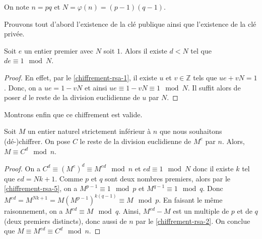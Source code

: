   \begin{notation}
    On note $n = pq$ et $N = \varphi(n) = (p-1)(q-1)$.
  \end{notation}

  Prouvons tout d'abord l'existence de la clé publique ainsi que l'existence de la clé privée.

  \begin{proposition}
    Soit $e$ un entier premier avec $N$ soit $1$. Alors il existe $d < N$ tel que $de \equiv 1 \mod N$.
  \end{proposition}

  \begin{proof}
    En effet, par le \cref{chiffrement-rsa-1}, il existe $u$ et $v \in \mathbb{Z}$ tels que $ue + vN = 1$. Donc, on a $ue = 1 - vN$ et ainsi $ue \equiv 1 - vN \equiv 1 \mod N$. Il suffit alors de poser $d$ le reste de la division euclidienne de $u$ par $N$.
  \end{proof}

  Montrons enfin que ce chiffrement est valide.

  \begin{proposition}
    Soit $M$ un entier naturel strictement inférieur à $n$ que nous souhaitons (dé-)chiffrer. On pose $C$ le reste de la division euclidienne de $M^e$ par $n$. Alors, $M \equiv C^d \mod n$.
  \end{proposition}

  \begin{proof}
    On a $C^d \equiv (M^e)^d \equiv M^{ed} \mod n$ et $ed \equiv 1 \mod N$ donc il existe $k$ tel que $ed = Nk + 1$. Comme $p$ et $q$ sont deux nombres premiers, alors par le \cref{chiffrement-rsa-5}, on a $M^{p-1} \equiv 1 \mod p$ et $M^{q-1} \equiv 1 \mod q$. Donc $M^{ed} = M^{Nk + 1} = M(M^{p-1})^{k(q-1)} \equiv M \mod p$. En faisant le même raisonnement, on a $M^{ed} \equiv M \mod q$. Ainsi, $M^{ed}-M$ est un multiple de $p$ et de $q$ (deux premiers distincts), donc aussi de $n$ par le \cref{chiffrement-rsa-2}. On conclue que $M \equiv M^{ed} \equiv C^d \mod n$.
  \end{proof}

